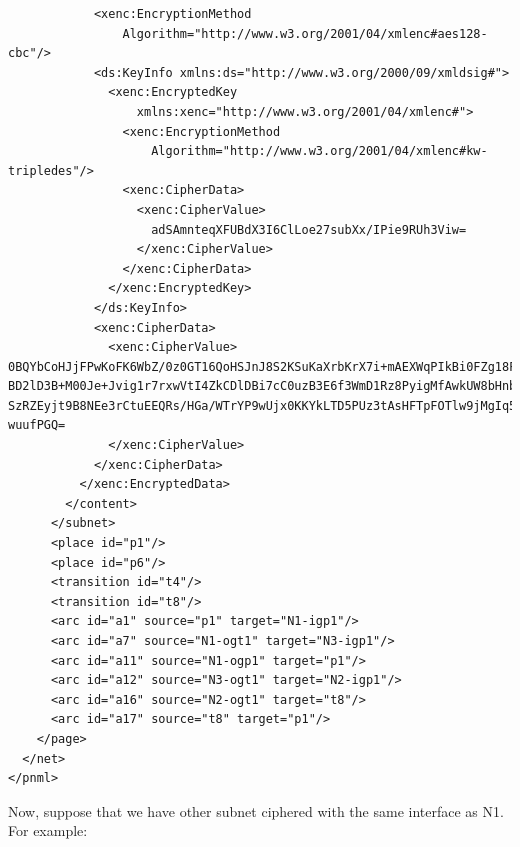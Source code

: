 \begin{lstlisting}
            <xenc:EncryptionMethod 
                Algorithm="http://www.w3.org/2001/04/xmlenc#aes128-cbc"/>
            <ds:KeyInfo xmlns:ds="http://www.w3.org/2000/09/xmldsig#">
              <xenc:EncryptedKey 
                  xmlns:xenc="http://www.w3.org/2001/04/xmlenc#">
                <xenc:EncryptionMethod 
                    Algorithm="http://www.w3.org/2001/04/xmlenc#kw-tripledes"/>
                <xenc:CipherData>
                  <xenc:CipherValue>
                    adSAmnteqXFUBdX3I6ClLoe27subXx/IPie9RUh3Viw=
                  </xenc:CipherValue>
                </xenc:CipherData>
              </xenc:EncryptedKey>
            </ds:KeyInfo>
            <xenc:CipherData>
              <xenc:CipherValue>
0BQYbCoHJjFPwKoFK6WbZ/0z0GT16QoHSJnJ8S2KSuKaXrbKrX7i+mAEXWqPIkBi0FZg18FwHlba
BD2lD3B+M00Je+Jvig1r7rxwVtI4ZkCDlDBi7cC0uzB3E6f3WmD1Rz8PyigMfAwkUW8bHnblqU+R
SzRZEyjt9B8NEe3rCtuEEQRs/HGa/WTrYP9wUjx0KKYkLTD5PUz3tAsHFTpFOTlw9jMgIq5QC9eP
wuufPGQ=
              </xenc:CipherValue>
            </xenc:CipherData>
          </xenc:EncryptedData>
        </content>
      </subnet>
      <place id="p1"/>
      <place id="p6"/>
      <transition id="t4"/>
      <transition id="t8"/>
      <arc id="a1" source="p1" target="N1-igp1"/>
      <arc id="a7" source="N1-ogt1" target="N3-igp1"/>
      <arc id="a11" source="N1-ogp1" target="p1"/>
      <arc id="a12" source="N3-ogt1" target="N2-igp1"/>
      <arc id="a16" source="N2-ogt1" target="t8"/>
      <arc id="a17" source="t8" target="p1"/>
    </page>
  </net>
</pnml>
\end{lstlisting}

Now, suppose that we have other subnet ciphered with the same interface as
N1. For example:


